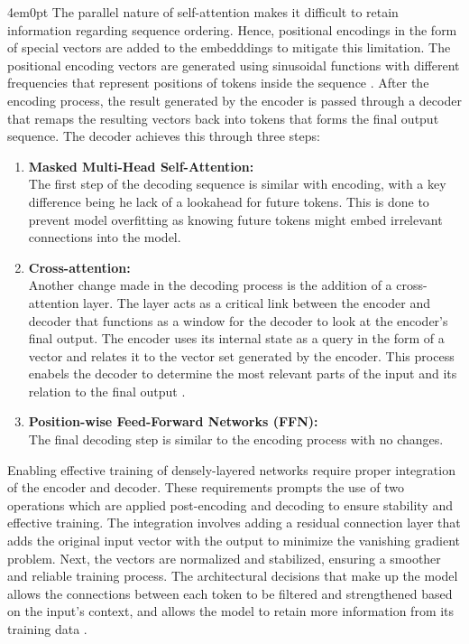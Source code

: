 \begin{indentedblock}{4em}{0pt}
			The parallel nature of self-attention makes it difficult to retain information regarding sequence ordering. Hence, positional encodings in the form of special vectors are added to the embedddings to mitigate this limitation. The positional encoding vectors are generated using sinusoidal functions with different frequencies that represent positions of tokens inside the sequence \parencite{attention_is_all_you_need_vaswani}. After the encoding process, the result generated by the encoder is passed through a decoder that remaps the resulting vectors back into tokens that forms the final output sequence. The decoder achieves this through three steps:
			
			\begin{enumerate}
				\item {
					\textbf{Masked Multi-Head Self-Attention:}\\
					The first step of the decoding sequence is similar with encoding, with a key difference being he lack of a lookahead for future tokens. This is done to prevent model overfitting as knowing future tokens might embed irrelevant connections into the model.
				}
				\item {
					\textbf{Cross-attention:} \\
					Another change made in the decoding process is the addition of a cross-attention layer. The layer acts as a critical link between the encoder and decoder that functions as a window for the decoder to look at the encoder's final output. The encoder uses its internal state as a query in the form of a vector and relates it to the vector set generated by the encoder. This process enabels the decoder to determine the most relevant parts of the input and its relation to the final output \parencite{attention_is_all_you_need_vaswani}.
				}
				\item {
					\textbf{Position-wise Feed-Forward Networks (FFN):} \\
					The final decoding step is similar to the encoding process with no changes.
				}
			\end{enumerate}
			
			Enabling effective training of densely-layered networks require proper integration of the encoder and decoder. These requirements prompts the use of two operations which are applied post-encoding and decoding to ensure stability and effective training. The integration involves adding a residual connection layer that adds the original input vector with the output to minimize the vanishing gradient problem. Next, the vectors are normalized and stabilized, ensuring a smoother and reliable training process. The architectural decisions that make up the model allows the connections between each token to be filtered and strengthened based on the input's context, and allows the model to retain more information from its training data \parencite{attention_is_all_you_need_vaswani}.
		\end{indentedblock}

